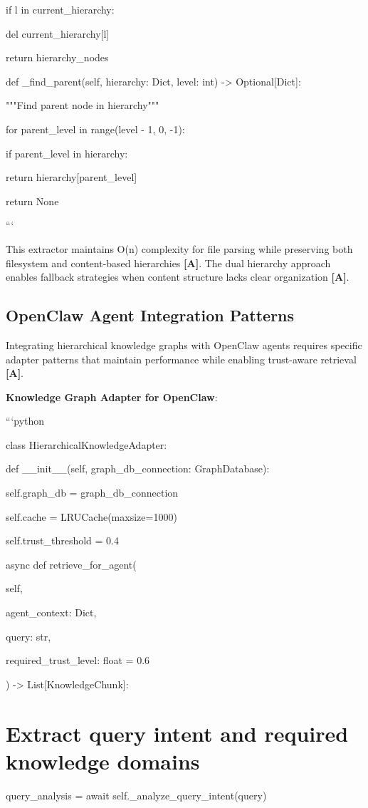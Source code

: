 \documentclass[a4paper,11pt]{article}
\newcommand{\alabel}{\textbf{\textcolor{acolor}{[A]}}}
\begin{document}
if l in current\_hierarchy:

del current\_hierarchy[l]


return hierarchy\_nodes


def \_find\_parent(self, hierarchy: Dict, level: int) -> Optional[Dict]:

"""Find parent node in hierarchy"""

for parent\_level in range(level - 1, 0, -1):

if parent\_level in hierarchy:

return hierarchy[parent\_level]

return None

```


This extractor maintains O(n) complexity for file parsing while preserving both filesystem and content-based hierarchies \alabel{}. The dual hierarchy approach enables fallback strategies when content structure lacks clear organization \alabel{}.


\subsection{OpenClaw Agent Integration Patterns}

Integrating hierarchical knowledge graphs with OpenClaw agents requires specific adapter patterns that maintain performance while enabling trust-aware retrieval \alabel{}.


\textbf{Knowledge Graph Adapter for OpenClaw}:

```python

class HierarchicalKnowledgeAdapter:

def \_\_init\_\_(self, graph\_db\_connection: GraphDatabase):

self.graph\_db = graph\_db\_connection

self.cache = LRUCache(maxsize=1000)

self.trust\_threshold = 0.4


async def retrieve\_for\_agent(

self,

agent\_context: Dict,

query: str,

required\_trust\_level: float = 0.6

) -> List[KnowledgeChunk]:


\section{Extract query intent and required knowledge domains}
query\_analysis = await self.\_analyze\_query\_intent(query)
\end{document}
